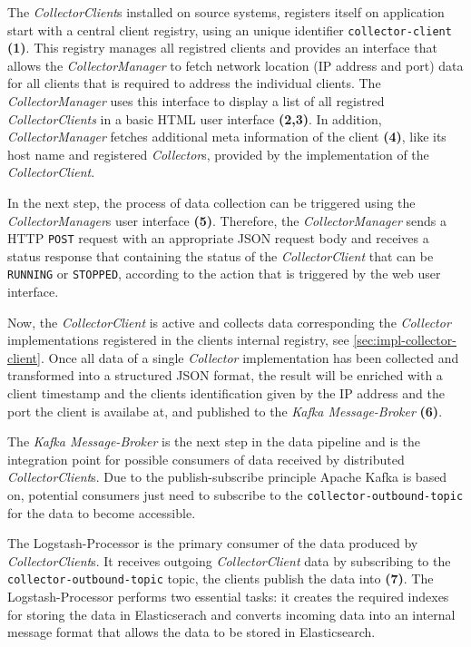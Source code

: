 The \textit{CollectorClient}s installed on source systems, registers itself on application start with a central client registry, using
an unique identifier \verb|collector-client| \textbf{(1)}. This registry manages all registred clients and provides an interface
that allows the \textit{CollectorManager} to fetch network location (IP address and port) data for all clients that is required
to address the individual clients. The \textit{CollectorManager} uses this interface to display a list of all registred
\textit{CollectorClients} in a basic HTML user interface \textbf{(2,3)}. In addition, \textit{CollectorManager} fetches additional
meta information of the client \textbf{(4)}, like its host name and registered \textit{Collector}s, provided by the implementation
of the \textit{CollectorClient}.

In the next step, the process of data collection can be triggered using the \textit{CollectorManager}s user interface \textbf{(5)}.
Therefore, the \textit{CollectorManager} sends a HTTP \verb|POST| request with an appropriate JSON request body and receives a
status response that containing the status of the \textit{CollectorClient} that can be \verb|RUNNING| or \verb|STOPPED|,
according to the action that is triggered by the web user interface.

Now, the \textit{CollectorClient} is active and collects data corresponding the \textit{Collector} implementations registered in
the clients internal registry, see \autoref{sec:impl-collector-client}. Once all data of a single
\textit{Collector} implementation has been collected and transformed into a structured JSON format, the result will be enriched
with a client timestamp and the clients identification given by the IP address and the port the client is availabe at, and published to the
\textit{Kafka Message-Broker} \textbf{(6)}.

The \textit{Kafka Message-Broker} is the next step in the data pipeline and is the integration point for possible consumers
of data received by distributed \textit{CollectorClient}s. Due to the publish-subscribe principle Apache Kafka is based on,
potential consumers just need to subscribe to the \verb|collector-outbound-topic| for the data to become accessible.

The Logstash-Processor is the primary consumer of the data produced by \textit{CollectorClient}s. It receives outgoing \textit{CollectorClient}
data by subscribing to the \verb|collector-outbound-topic| topic, the clients publish the data into \textbf{(7)}. The Logstash-Processor performs
two essential tasks: it creates the required indexes for storing the data in Elasticserach and converts incoming data into an internal
message format that allows the data to be stored in Elasticsearch.

